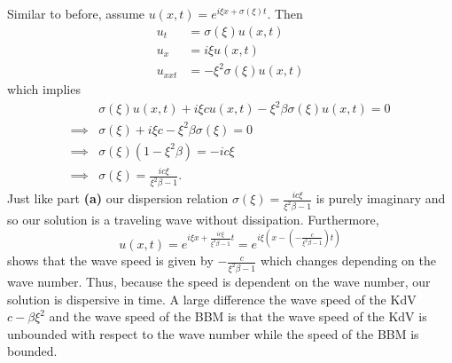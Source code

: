\documentclass[a4paper,12pt]{article}
\begin{document}
\begin{enumerate}[label = \textbf{(\alph*)}]
		Similar to before, assume $ u(x,t) = e^{i\xi x + \sigma(\xi)t} $. Then
		\begin{align*}
			u_t        &= \sigma(\xi) u(x,t) \\
			u_x       &= i \xi u(x,t) \\
			u_{xxt} &= -\xi^2 \sigma(\xi) u(x,t)
		\end{align*}
		which implies
		\begin{align*}
			& \sigma(\xi)u(x,t) + i \xi c u(x,t) - \xi^2\beta \sigma(\xi) u(x,t) = 0 \\
			\implies & \sigma(\xi) + i \xi c - \xi^2\beta \sigma(\xi) = 0 \\
			\implies & \sigma(\xi)(1 - \xi^2 \beta) = -i c \xi \\
			\implies & \sigma(\xi) = \frac{i c \xi}{\xi^2 \beta - 1}.
		\end{align*}
		Just like part \textbf{(a)} our dispersion relation $ \sigma(\xi) = \frac{i c \xi}{\xi^2 \beta - 1} $ is purely imaginary and so our solution is a traveling wave without dissipation. Furthermore,
		\[
			u(x,t) = e^{i \xi x + \frac{i c \xi}{\xi^2 \beta - 1} t} = e^{i \xi \left (x -\left (- \frac{c}{\xi^2 \beta - 1}\right ) t\right )}
		\]
		shows that the wave speed is given by $ -\frac{c}{\xi^2 \beta - 1} $ which changes depending on the wave number. Thus, because the speed is dependent on the wave number, our solution is dispersive in time. A large difference the wave speed of the KdV $ c - \beta \xi^2 $ and the wave speed of the BBM is that the wave speed of the KdV is unbounded with respect to the wave number while the speed of the BBM is bounded.
	\end{enumerate}
\end{document}
